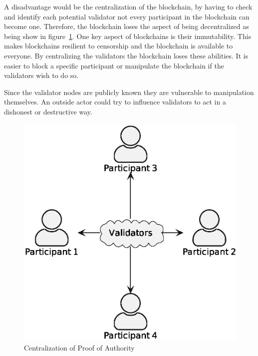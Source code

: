 A disadvantage would be the centralization of the blockchain, by having to check and identify each potential validator not every participant in the blockchain can become one.
Therefore, the blockchain loses the aspect of being decentralized as being show in figure\ \ref{fig:centralization-of-proof-of-authority}.
One key aspect of blockchains is their immutability.
This makes blockchains resilient to censorship and the blockchain is available to everyone.
By centralizing the validators the blockchain loses these abilities.
It is easier to block a specific participant  or manipulate the blockchain if the validators wish to do so.

Since the validator nodes are publicly known they are vulnerable to manipulation themselves.
An outside actor could try to influence validators to act in a dishonest or destructive way.\cite{insidecrypto-poa,coindesk-poa}

\begin{figure}[h]
    \centering
    \includegraphics[scale=0.5]{img/proof-of-authority-0}
    \caption{Centralization of Proof of Authority}
    \label{fig:centralization-of-proof-of-authority}
\end{figure}

